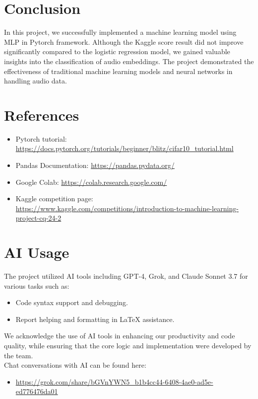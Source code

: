 \documentclass[12pt, a4paper]{article}
\begin{document}
\section{Conclusion}

\indent In this project, we successfully implemented a machine learning model using MLP in Pytorch framework. Although the Kaggle score result did not improve significantly compared to the logistic regression model, we gained valuable insights into the classification of audio embeddings. The project demonstrated the effectiveness of traditional machine learning models and neural networks in handling audio data.

\section{References}
\begin{itemize}
    \item Pytorch tutorial: \url{https://docs.pytorch.org/tutorials/beginner/blitz/cifar10_tutorial.html}
    \item Pandas Documentation: \url{https://pandas.pydata.org/}
    \item Google Colab: \url{https://colab.research.google.com/}
    \item Kaggle competition page: \\
        \url{https://www.kaggle.com/competitions/introduction-to-machine-learning-project-cq-24-2}
\end{itemize}

\section{AI Usage}
The project utilized AI tools including GPT-4, Grok, and Claude Sonnet 3.7 for various tasks such as:

\begin{itemize}
    \item Code syntax support and debugging.
    \item Report helping and formatting in LaTeX assistance.
\end{itemize}

We acknowledge the use of AI tools in enhancing our productivity and code quality, while ensuring that the core logic and implementation were developed by the team.\\
\indent Chat conversations with AI can be found here:
\begin{itemize}
    \item \url{https://grok.com/share/bGVnYWN5_b1b4cc44-6408-4ae0-ad5e-ed776476da01}
\end{itemize}
\end{document}
